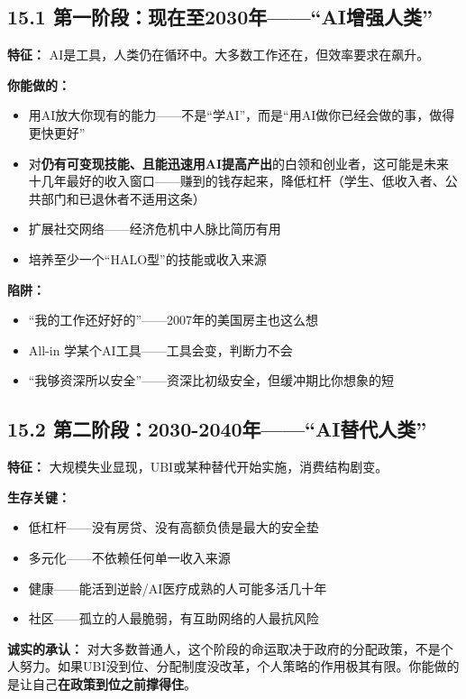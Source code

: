 \documentclass[11pt,a4paper]{ctexart}
\begin{document}
\subsection{15.1 第一阶段：现在至2030年——“AI增强人类”}

\textbf{特征：} AI是工具，人类仍在循环中。大多数工作还在，但效率要求在飙升。

\textbf{你能做的：}

\begin{itemize}
  \item 用AI放大你现有的能力——不是“学AI”，而是“用AI做你已经会做的事，做得更快更好”
  \item 对\textbf{仍有可变现技能、且能迅速用AI提高产出}的白领和创业者，这可能是未来十几年最好的收入窗口——赚到的钱存起来，降低杠杆（学生、低收入者、公共部门和已退休者不适用这条）
  \item 扩展社交网络——经济危机中人脉比简历有用
  \item 培养至少一个“HALO型”的技能或收入来源
\end{itemize}

\textbf{陷阱：}

\begin{itemize}
  \item “我的工作还好好的”——2007年的美国房主也这么想
  \item All-in 学某个AI工具——工具会变，判断力不会
  \item “我够资深所以安全”——资深比初级安全，但缓冲期比你想象的短
\end{itemize}

\subsection{15.2 第二阶段：2030-2040年——“AI替代人类”}

\textbf{特征：} 大规模失业显现，UBI或某种替代开始实施，消费结构剧变。

\textbf{生存关键：}

\begin{itemize}
  \item 低杠杆——没有房贷、没有高额负债是最大的安全垫
  \item 多元化——不依赖任何单一收入来源
  \item 健康——能活到逆龄/AI医疗成熟的人可能多活几十年
  \item 社区——孤立的人最脆弱，有互助网络的人最抗风险
\end{itemize}

\textbf{诚实的承认：} 对大多数普通人，这个阶段的命运取决于政府的分配政策，不是个人努力。如果UBI没到位、分配制度没改革，个人策略的作用极其有限。你能做的是让自己\textbf{在政策到位之前撑得住}。
\end{document}
